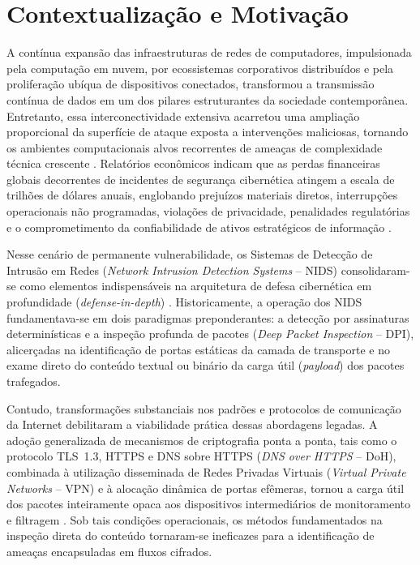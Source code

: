 \section{Contextualização e Motivação}
\label{sec:contextualizacao}

A contínua expansão das infraestruturas de redes de computadores, impulsionada pela computação em nuvem, por ecossistemas corporativos distribuídos e pela proliferação ubíqua de dispositivos conectados, transformou a transmissão contínua de dados em um dos pilares estruturantes da sociedade contemporânea. Entretanto, essa interconectividade extensiva acarretou uma ampliação proporcional da superfície de ataque exposta a intervenções maliciosas, tornando os ambientes computacionais alvos recorrentes de ameaças de complexidade técnica crescente \cite{cyberrisk2025}. Relatórios econômicos indicam que as perdas financeiras globais decorrentes de incidentes de segurança cibernética atingem a escala de trilhões de dólares anuais, englobando prejuízos materiais diretos, interrupções operacionais não programadas, violações de privacidade, penalidades regulatórias e o comprometimento da confiabilidade de ativos estratégicos de informação \cite{aiimpact2026}.

Nesse cenário de permanente vulnerabilidade, os Sistemas de Detecção de Intrusão em Redes (\emph{Network Intrusion Detection Systems} -- NIDS) consolidaram-se como elementos indispensáveis na arquitetura de defesa cibernética em profundidade (\emph{defense-in-depth}) \cite{advancedids2024, p4nids2025}. Historicamente, a operação dos NIDS fundamentava-se em dois paradigmas preponderantes: a detecção por assinaturas determinísticas e a inspeção profunda de pacotes (\emph{Deep Packet Inspection} -- DPI), alicerçadas na identificação de portas estáticas da camada de transporte e no exame direto do conteúdo textual ou binário da carga útil (\emph{payload}) dos pacotes trafegados. 

Contudo, transformações substanciais nos padrões e protocolos de comunicação da Internet debilitaram a viabilidade prática dessas abordagens legadas. A adoção generalizada de mecanismos de criptografia ponta a ponta, tais como o protocolo TLS~1.3, HTTPS e DNS sobre HTTPS (\emph{DNS over HTTPS} -- DoH), combinada à utilização disseminada de Redes Privadas Virtuais (\emph{Virtual Private Networks} -- VPN) e à alocação dinâmica de portas efêmeras, tornou a carga útil dos pacotes inteiramente opaca aos dispositivos intermediários de monitoramento e filtragem \cite{standard2021, trafficmoe2026}. Sob tais condições operacionais, os métodos fundamentados na inspeção direta do conteúdo tornaram-se ineficazes para a identificação de ameaças encapsuladas em fluxos cifrados.

